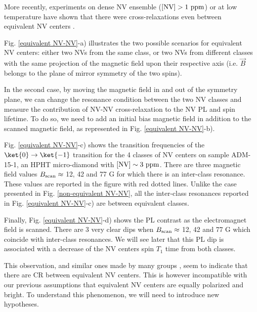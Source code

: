 \documentclass[a4paper, 11pt]{report}
\begin{document}
More recently, experiments on dense NV ensemble ($[\rm NV ] >1\ \rm ppm$) or at low temperature have shown that there were cross-relaxations even between equivalent NV centers \citep{jarmola2012temperature, mrozek2015longitudinal, jarmola2015longitudinal, choi2017depolarization}.

Fig. \ref{equivalent NV-NV}-a) illustrates the two possible scenarios for equivalent NV centers: either two NVs from the same class, or two NVs from different classes with the same projection of the magnetic field upon their respective axis (i.e. $\vec{B}$ belongs to the plane of mirror symmetry of the two spins). 

In the second case, by moving the magnetic field in and out of the symmetry plane, we can change the resonance condition between the two NV classes and measure the contribution of NV-NV cross-relaxation to the NV PL and spin lifetime. To do so, we need to add an initial bias magnetic field in addition to the scanned magnetic field, as represented in Fig. \ref{equivalent NV-NV}-b). %

Fig. \ref{equivalent NV-NV}-c) shows the transition frequencies of the $\ket{0}\to\ket{-1}$ transition for the 4 classes of NV centers on sample ADM-15-1, an HPHT micro-diamond with $[\rm NV]\sim 3\ \rm ppm$. There are three magnetic field values $B_{\rm scan} \approx$ 12, 42 and 77 G for which there is an inter-class resonance. These values are reported in the figure with red dotted lines. Unlike the case presented in Fig. \ref{non-equivalent NV-NV}, all the inter-class resonances reported in Fig. \ref{equivalent NV-NV}-c) are between equivalent classes.

Finally, Fig. \ref{equivalent NV-NV}-d) shows the PL contrast as the electromagnet field is scanned. There are 3 very clear dips when $B_{\rm scan} \approx$ 12, 42 and 77 G which coincide with inter-class resonances. We will see later that this PL dip is associated with a decrease of the NV centers spin $T_1$ time from both classes.

This observation, and similar ones made by many groups \citep{jarmola2012temperature, mrozek2015longitudinal, choi2017depolarization, akhmedzhanov2017microwave, giri2018coupled}, seem to indicate that there are CR between equivalent NV centers. This is however incompatible with our previous assumptions that equivalent NV centers are equally polarized and bright. To understand this phenomenon, we will need to introduce new hypotheses.
\end{document}
